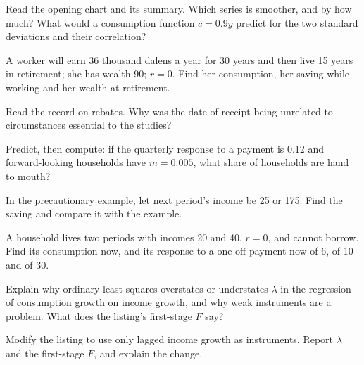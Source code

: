 \begin{exercise}[$\star$]\label{exo:b2:consumption:1}
Read the opening chart and its summary. Which series is smoother, and by how much? What would a consumption function
$c = 0.9y$ predict for the two standard deviations and their correlation?
\end{exercise}

\begin{exercise}[$\star$]\label{exo:b2:consumption:2}
A worker will earn 36 thousand dalens a year for 30 years and then live 15 years in retirement; she has wealth 90; $r = 0$. Find her
consumption, her saving while working and her wealth at retirement.
\end{exercise}

\begin{exercise}[$\star$]\label{exo:b2:consumption:3}
Read the record on rebates. Why was the date of receipt being unrelated to circumstances essential to the studies?
\end{exercise}

\begin{exercise}[$\star$]\label{exo:b2:consumption:4}
Predict, then compute: if the quarterly response to a payment is 0.12 and forward-looking households have $m = 0.005$, what share of
households are hand to mouth?
\end{exercise}

\begin{exercise}[$\star\star$]\label{exo:b2:consumption:5}
In the precautionary example, let next period's income be 25 or 175. Find the saving and compare it with the example.
\end{exercise}

\begin{exercise}[$\star\star$]\label{exo:b2:consumption:6}
A household lives two periods with incomes 20 and 40, $r = 0$, and cannot borrow. Find its consumption now, and its response to a
one-off payment now of 6, of 10 and of 30.
\end{exercise}

\begin{exercise}[$\star\star$]\label{exo:b2:consumption:7}
Explain why ordinary least squares overstates or understates $\lambda$ in the regression of consumption growth on income growth,
and why weak instruments are a problem. What does the listing's first-stage $F$ say?
\end{exercise}

\begin{exercise}[$\star\star$]\label{exo:b2:consumption:8}
Modify the listing to use only lagged income growth as instruments. Report $\lambda$ and the first-stage $F$, and explain the change.
\end{exercise}


